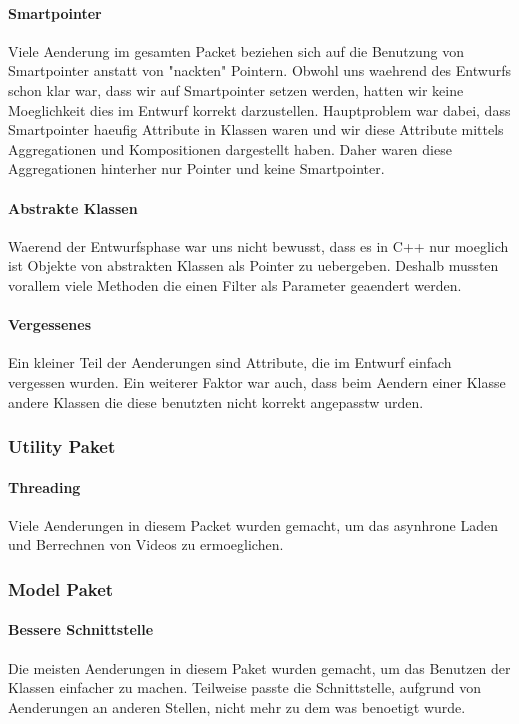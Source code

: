 \documentclass{scrartcl}
\begin{document}
{\paragraph{Smartpointer} Viele Aenderung im gesamten Packet beziehen sich auf die Benutzung von Smartpointer anstatt von "nackten" Pointern. Obwohl uns waehrend des Entwurfs schon klar war, dass wir auf Smartpointer setzen werden, hatten wir keine Moeglichkeit dies im Entwurf korrekt darzustellen. Hauptproblem war dabei, dass Smartpointer haeufig Attribute in Klassen waren und wir diese Attribute mittels Aggregationen und Kompositionen dargestellt haben. Daher waren diese Aggregationen hinterher nur Pointer und keine Smartpointer.
\paragraph{Abstrakte Klassen} Waerend der Entwurfsphase war uns nicht bewusst, dass es in C++ nur moeglich ist Objekte von abstrakten Klassen als Pointer zu uebergeben. Deshalb mussten vorallem viele Methoden die einen Filter als Parameter geaendert werden.
\paragraph{Vergessenes} Ein kleiner Teil der Aenderungen sind Attribute, die im Entwurf einfach vergessen wurden. Ein weiterer Faktor war auch, dass beim Aendern einer Klasse andere Klassen die diese benutzten nicht korrekt angepasstw urden.
\subsubsection{Utility Paket}
\paragraph{Threading}
Viele Aenderungen in diesem Packet wurden gemacht, um das  asynhrone Laden und Berrechnen von Videos zu ermoeglichen.
\subsubsection{Model Paket}
\paragraph{Bessere Schnittstelle} Die meisten Aenderungen in diesem Paket wurden gemacht, um das Benutzen der Klassen einfacher zu machen. Teilweise passte die Schnittstelle, aufgrund von Aenderungen an anderen Stellen, nicht mehr zu dem was benoetigt wurde.
}
\end{document}
